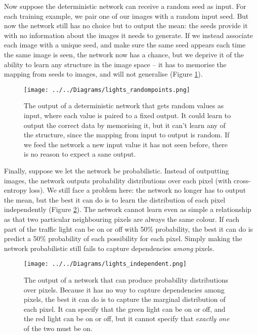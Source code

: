 \documentclass[11pt, a4paper]{book}
\begin{document}
Now suppose the deterministic network can receive a random seed as input. For each training example, we pair one of our images with a random input seed. But now the network still has no choice but to output the mean: the seeds provide it with no information about the images it needs to generate. If we instead associate each image with a unique seed, and make sure the same seed appears each time the same image is seen, the network now has a chance, but we deprive it of the ability to learn any structure in the image space -- it has to memorise the mapping from seeds to images, and will not generalise (Figure \ref{randompoints}).

\begin{figure}
  \centering
  \texttt{[image: ../../Diagrams/lights\_randompoints.png]}
  \caption[Output of a deterministic network with random values as input]{The output of a deterministic network that gets random values as input, where each value is paired to a fixed output. It could learn to output the correct data by memorising it, but it can't learn any of the structure, since the mapping from input to output is random. If we feed the network a new input value it has not seen before, there is no reason to expect a sane output.}
  \label{randompoints}
\end{figure}

Finally, suppose we let the network be probabilistic. Instead of outputting images, the network outputs probability distributions over each pixel (with cross-entropy loss). We still face a problem here: the network no longer has to output the mean, but the best it can do is to learn the distribution of each pixel independently (Figure \ref{independent}). The network cannot learn even as simple a relationship as that two particular neighbouring pixels are always the same colour. If each part of the traffic light can be on or off with 50\% probability, the best it can do is predict a 50\% probability of each possibility for each pixel. Simply making the network probabilistic still fails to capture dependencies \emph{among} pixels.

\begin{figure}
  \centering
  \texttt{[image: ../../Diagrams/lights\_independent.png]}
  \caption[Output of a network that can produce probability distributions]{The output of a network that can produce probability distributions over pixels. Because it has no way to capture dependencies among pixels, the best it can do is to capture the marginal distribution of each pixel. It can specify that the green light can be on or off, and the red light can be on or off, but it cannot specify that \emph{exactly one} of the two must be on.}
  \label{independent}
\end{figure}
\end{document}
